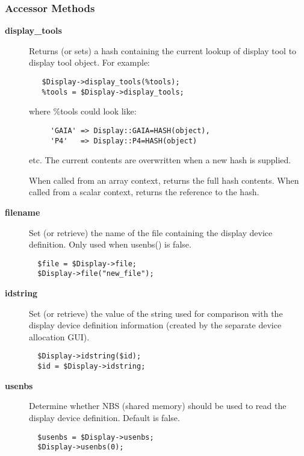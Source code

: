 \subsubsection*{Accessor Methods\label{ORAC::Display_Accessor_Methods}}\begin{description}
\item[\textbf{display\_tools}] \mbox{}

Returns (or sets) a hash containing the current lookup of display tool
to display tool object. For example:

\begin{verbatim}
   $Display->display_tools(%tools);
   %tools = $Display->display_tools;
\end{verbatim}


where \%tools could look like:

\begin{verbatim}
     'GAIA' => Display::GAIA=HASH(object),
     'P4'   => Display::P4=HASH(object)
\end{verbatim}


etc. The current contents are overwritten when a new hash is supplied.



When called from an array context, returns the full hash contents.
When called from a scalar context, returns the reference to the hash.

\item[\textbf{filename}] \mbox{}

Set (or retrieve) the name of the file containing the display device
definition. Only used when usenbs() is false.

\begin{verbatim}
  $file = $Display->file;
  $Display->file("new_file");
\end{verbatim}
\item[\textbf{idstring}] \mbox{}

Set (or retrieve) the value of the string used for comparison
with the display device definition information (created by the
separate device allocation GUI).

\begin{verbatim}
  $Display->idstring($id);
  $id = $Display->idstring;
\end{verbatim}
\item[\textbf{usenbs}] \mbox{}

Determine whether NBS (shared memory) should be used to read the
display device definition. Default is false.

\begin{verbatim}
  $usenbs = $Display->usenbs;
  $Display->usenbs(0);
\end{verbatim}
\end{description}
